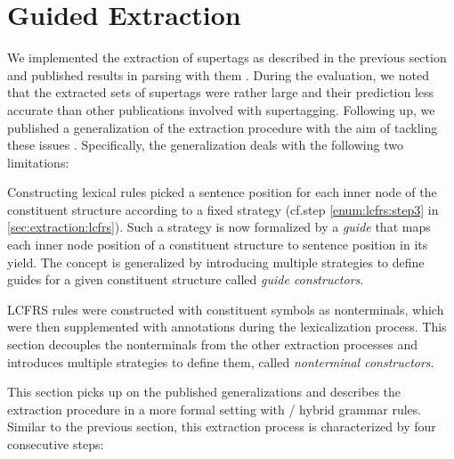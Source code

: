 \documentclass[../../document.tex]{subfiles}
\begin{document}
    \section{Guided Extraction} \label{sec:extraction:guided}
    We implemented the extraction of  supertags as described in the previous section and published results in parsing with them \citep{RupMoe21}.
    During the evaluation, we noted that the extracted sets of supertags were rather large and their prediction less accurate than other publications involved with supertagging.
    Following up, we published a generalization of the extraction procedure with the aim of tackling these issues \citep{Rup22}.
    Specifically, the generalization deals with the following two limitations:
    \begin{compactitem}
        \item
            Constructing lexical  rules picked a sentence position for each inner node of the constituent structure according to a fixed strategy (cf.\@ step \ref{enum:lcfrs:step3} in \cref{sec:extraction:lcfrs}).
            Such a strategy is now formalized by a \emph{guide} that maps each inner node position of a constituent structure to sentence position in its yield.
            The concept is generalized by introducing multiple strategies to define guides for a given constituent structure called \emph{guide constructors}.
        \item
            LCFRS rules were constructed with constituent symbols as nonterminals, which were then supplemented with annotations during the lexicalization process.
            This section decouples the nonterminals from the other extraction processes and introduces multiple strategies to define them, called \emph{nonterminal constructors}.
    \end{compactitem}
    This section picks up on the published generalizations and describes the extraction procedure in a more formal setting with / hybrid grammar rules.
    Similar to the previous section, this extraction process is characterized by four consecutive steps:
\end{document}
